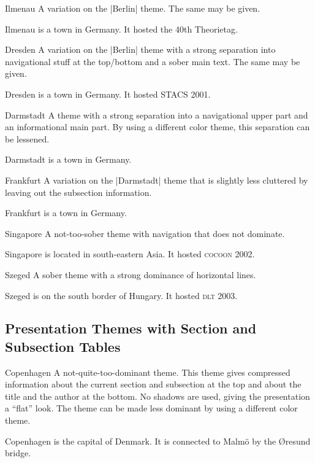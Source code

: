 \begin{themeexample}{Ilmenau}
  A variation on the |Berlin| theme. The same  may be given.

  Ilmenau is a town in Germany. It hosted the 40th Theorietag.
\end{themeexample}

\begin{themeexample}{Dresden}
  A variation on the |Berlin| theme with a strong separation into navigational stuff at the top/bottom and a sober main text. The same  may be given.

  Dresden is a town in Germany. It hosted STACS 2001.
\end{themeexample}


\begin{themeexample}{Darmstadt}
  A theme with a strong separation into a navigational upper part and an informational main part. By using a different color theme, this separation can be lessened.

  Darmstadt is a town in Germany.
\end{themeexample}

\begin{themeexample}{Frankfurt}
  A variation on the |Darmstadt| theme that is slightly less cluttered by leaving out the subsection information.

  Frankfurt is a town in Germany.
\end{themeexample}

\begin{themeexample}{Singapore}
  A not-too-sober theme with navigation that does not dominate.

  Singapore is located in south-eastern Asia. It hosted \textsc{cocoon} 2002.
\end{themeexample}

\begin{themeexample}{Szeged}
  A sober theme with a strong dominance of horizontal lines.

  Szeged is on the south border of Hungary. It hosted \textsc{dlt} 2003.
\end{themeexample}


\subsection{Presentation Themes with Section and Subsection Tables}

\begin{themeexample}{Copenhagen}
  A not-quite-too-dominant theme. This theme gives compressed information about the current section and subsection at the top and about the title and the author at the bottom. No shadows are used, giving the presentation a ``flat'' look. The theme can be made less dominant by using a different color theme.

  Copenhagen is the capital of Denmark. It is connected to Malm\"o by the \O resund bridge.
\end{themeexample}

